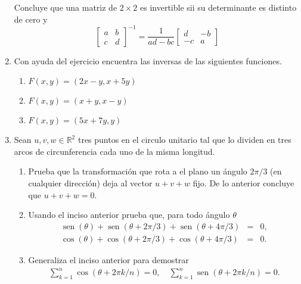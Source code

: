 \documentclass{article}
\theoremstyle{definition}
\newcommand{\sen}{\operatorname{sen}}
\begin{document}
\begin{enumerate}
	Concluye que una matriz de $2 \times 2$ es invertible sii su determinante es distinto de cero y
	$$
\left[
	\begin{array}{cc}
	a & b \\
	c & d
	\end{array}
	\right]^{-1} 
	=\frac{1}{ad-bc}\left[
	\begin{array}{cc}
	d & -b \\
	-c & a
	\end{array}
	\right]
	$$
	
	
	\item Con ayuda del ejercicio encuentra las inversas de las siguientes funciones.
	\begin{enumerate}
	\item $F(x,y)=(2x-y, x+5y)$
	\item $F(x,y)=(x+y, x-y)$
	\item $F(x,y)=(5x+7y, y)$
	\end{enumerate}			
	
	
     \item Sean $u,v, w \in \mathbb{R}^2$ tres
       puntos en el circulo unitario tal que lo dividen en tres arcos de circunferencia cada uno de la misma longitud.
       \begin{enumerate}
       \item Prueba que la transformaci\'on que rota a el plano un \'angulo $2\pi/3$ (en cualquier direcci\'on)
         deja al vector $u+v+w$ fijo. De lo anterior concluye que $u+v+w=0$.
       \item Usando el inciso anterior prueba que, para todo \'angulo $\theta$
         \begin{eqnarray*}
         \sen(\theta)+\sen(\theta+2\pi/3)+\sen(\theta+4\pi/3)&=&0, \\
         \cos(\theta)+\cos(\theta+2\pi/3)+\cos(\theta+4\pi/3)&=&0 .
         \end{eqnarray*}

       \item Generaliza el inciso anterior para demostrar
         \begin{eqnarray*}
           \sum_{k=1}^n \cos(\theta+ 2\pi k/n)=0, \quad  \sum_{k=1}^n \sen(\theta +2\pi k /n)=0.
         \end{eqnarray*}
       \end{enumerate}



  \end{enumerate}

  
       
\end{document}
